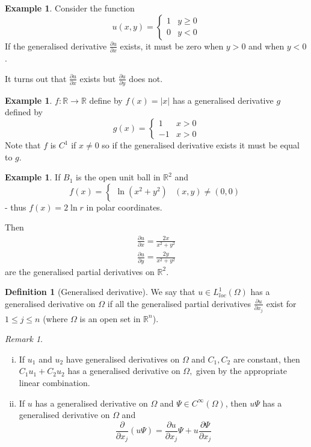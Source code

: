 \documentclass[10pt, oneside, reqno]{amsart}
\theoremstyle{plain}%
\numberwithin{equation}{section}
\theoremstyle{definition}
\newtheorem{defn}[thm]{Definition}
\newtheorem{exmp}[thm]{Example}
\theoremstyle{remark}
\newtheorem*{rem}{Remark}
\newcommand{\R}{\mathbb{R}}
\begin{document}
\begin{exmp}
	Consider the function \[
		u(x, y) = \begin{cases}
			1 & y \geq 0	\\
			0 & y < 0		
		\end{cases}
	\]  If the generalised derivative $\frac{\partial u}{\partial x}$ exists, it must be zero when $y > 0$ and when $y < 0$.  
	
	It turns out that $\frac{\partial u}{\partial x}$ exists but $\frac{\partial u}{\partial y}$ does not.
\end{exmp}

\begin{exmp}
	$f: \R \rightarrow \R$ define by $f(x) = |x|$ has a generalised derivative $g$ defined by \[
		g(x) = \begin{cases}
			1 & x > 0 \\
			-1 & x > 0
		\end{cases}
	\]  Note that $f$ is $C^1$ if $x \neq 0$ so if the generalised derivative exists it must be equal to $g$. 
	\end{exmp}

\begin{exmp}
	If $B_1$ is the open unit ball in $\R^2$ and \[
		f(x) = \begin{cases}
			\ln(x^2 + y^2) & (x, y) \neq (0, 0) 
		\end{cases}
	\] - thus $f(x) = 2 \ln r$ in polar coordinates.
	
	Then \begin{align*}
		\frac{\partial u}{\partial x} = \frac{2x}{x^2 + y^2}  \\
		\frac{\partial u}{\partial y} = \frac{2y}{x^2 + y^2} 
	\end{align*} are the generalised partial derivatives on $\R^2$.
\end{exmp}

\begin{defn}[Generalised derivative]
	We say that $u \in L^1_{loc}(\Omega)$ has a generalised derivative on $\Omega$ if all the generalised partial derivatives $\frac{\partial u}{\partial x_j}$ exist for $1 \leq j \leq n$ (where $\Omega$ is an open set in $\R^n$).
\end{defn}

\begin{rem}{\ }
	\begin{enumerate}[(i)]
		\item If $u_1$ and $u_2$ have generalised derivatives on $\Omega$ and $C_1, C_2$ are constant, then $C_1u_1 + C_2 u_2$ has a generalised derivative on $\Omega,$ given by the appropriate linear combination.  
		\item If $u$ has a generalised derivative on $\Omega$ and $\Psi \in C^\infty(\Omega)$, then  $u\Psi$ has a generalised derivative on $\Omega$ and \[
			\frac{\partial}{\partial x_j} (u \Psi) = \frac{\partial u}{\partial x_j} \Psi + u \frac{\partial \Psi}{\partial x_j}
		\]
	\end{enumerate}
\end{rem}
	
\end{document}
